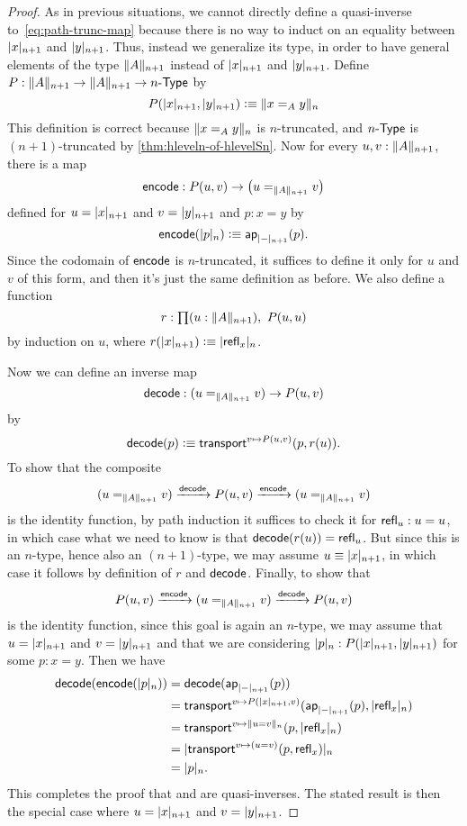\begin{proof}
  As in previous situations, we cannot directly define a quasi-inverse to~\eqref{eq:path-trunc-map} because there is no way to induct on an equality between $\tproj {n+1}x$ and $\tproj {n+1}y$.
  Thus, instead we generalize its type, in order to have general elements of the type $\trunc{n+1}A$ instead of $\tproj {n+1}x$ and $\tproj {n+1}y$.
  Define $P:\trunc {n+1}A\to\trunc {n+1}A\to\typele{n}$ by
  \[P(\tproj {n+1}x,\tproj {n+1}y)\defeq \trunc n{x=_Ay}\]
  This definition is correct because $\trunc n{x=_Ay}$ is $n$-truncated, and $\typele{n}$ is $(n+1)$-truncated by \autoref{thm:hleveln-of-hlevelSn}.
  Now for every $u,v:\trunc{n+1}A$, there is a map
  \[\encode:P(u,v) \to \big(u=_{\trunc{n+1}A}v\big)\]
  defined for $u=\tproj {n+1}x$ and $v=\tproj {n+1}y$ and $p:x=y$ by
  \[\encode(\tproj n{p})\defeq \apfunc{\tproj{n+1}-} (p).\]
  Since the codomain of $\encode$ is $n$-truncated, it suffices to define it only for $u$ and $v$ of this form, and then it's just the same definition as before.
  We also define a function
  \[ r : \prd{u:\trunc{n+1} A} P(u,u) \]
  by induction on $u$, where $r(\tproj{n+1} x) \defeq \tproj n {\refl x}$.

  Now we can define an inverse map
  \[\decode: (u=_{\trunc{n+1}A}v) \to P(u,v)\]
  by
  \[\decode(p) \defeq \transfib{v\mapsto P(u,v)}{p}{r(u)}. \]
  To show that the composite
  \[ (u=_{\trunc{n+1}A}v) \xrightarrow{\decode} P(u,v) \xrightarrow{\encode} (u=_{\trunc{n+1}A}v) \]
  is the identity function, by path induction it suffices to check it for $\refl u : u=u$, in which case what we need to know is that $\decode(r(u)) = \refl{u}$.
  But since this is an $n$-type, hence also an $(n+1)$-type, we may assume $u\jdeq \tproj {n+1} x$, in which case it follows by definition of $r$ and $\decode$.
  Finally, to show that 
  \[ P(u,v) \xrightarrow{\encode} (u=_{\trunc{n+1}A}v) \xrightarrow{\decode} P(u,v) \]
  is the identity function, since this goal is again an $n$-type, we may assume that $u=\tproj {n+1}x$ and $v=\tproj {n+1}y$ and that we are considering $\tproj n p:P(\tproj{n+1}x,\tproj{n+1}y)$ for some $p:x=y$.
  Then we have
  \begin{align*}
    \decode(\encode(\tproj n p)) &= \decode(\apfunc{\tproj{n+1}-}(p))\\
    &= \transfib{v\mapsto P(\tproj{n+1}x,v)}{\apfunc{\tproj{n+1}-}(p)}{\tproj n {\refl x}}\\
    &= \transfib{v\mapsto \trunc n{u=v}}{p}{\tproj n {\refl x}}\\
    &= \tproj n {\transfib{v \mapsto (u=v)}{p}{\refl x}}\\
    &= \tproj n p.
  \end{align*}
  This completes the proof that \encode and \decode are quasi-inverses.
  The stated result is then the special case where $u=\tproj {n+1}x$ and $v=\tproj {n+1}y$.
\end{proof}

